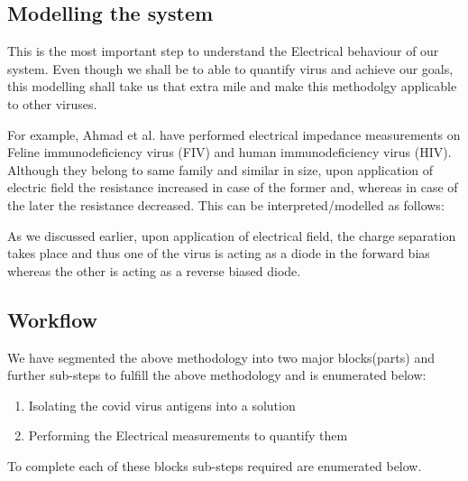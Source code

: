 \documentclass{FR16}
\begin{document}
\subsection{Modelling the system}
This is the most important step to understand the Electrical behaviour of our system. Even though we shall be to able to quantify virus and achieve our goals, this modelling shall take us that extra mile and make this methodolgy applicable to other viruses. 

For example, Ahmad et al. have performed electrical impedance measurements on Feline immunodeficiency virus (FIV) and
human immunodeficiency virus (HIV). Although they belong to same family and similar in size, upon application of electric field the resistance increased in case of the former and, whereas in case of the later the resistance decreased. This can be interpreted/modelled as follows:

As we discussed earlier, upon application of electrical field, the 
charge separation takes place and thus one of the virus is acting as a diode in the forward bias whereas the other is acting as a reverse biased diode.






\subsection{Workflow}
We have segmented the above methodology into two major blocks(parts) and further sub-steps to fulfill the above methodology and is enumerated below:
\begin{enumerate}
    \item Isolating the covid virus antigens into a solution
    
    \item Performing the Electrical measurements to quantify them
\end{enumerate}

To complete each of these blocks sub-steps required are enumerated below.
\end{document}
